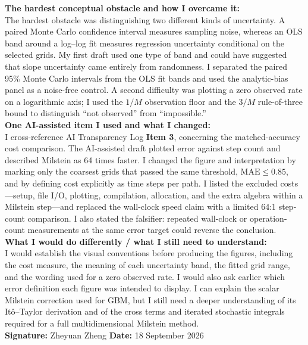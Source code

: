 \documentclass[11pt,a4paper]{article}
\theoremstyle{definition}
\theoremstyle{remark}
\begin{document}
\begin{formbox}
\begin{enumerate}[leftmargin=2em]
\end{enumerate}

\textbf{The hardest conceptual obstacle and how I overcame it:}\\
The hardest obstacle was distinguishing two different kinds of uncertainty.
A paired Monte Carlo confidence interval measures sampling noise, whereas an
OLS band around a log--log fit measures regression uncertainty conditional
on the selected grids. My first draft used one type of band and could have
suggested that slope uncertainty came entirely from randomness. I separated
the paired 95\% Monte Carlo intervals from the OLS fit bands and used the
analytic-bias panel as a noise-free control. A second difficulty was plotting
a zero observed rate on a logarithmic axis; I used the $1/M$ observation
floor and the $3/M$ rule-of-three bound to distinguish ``not observed'' from
``impossible.''\\[0.4em]

\textbf{One AI-assisted item I used and what I changed:}\\
I cross-reference AI Transparency Log \textbf{Item 3}, concerning the
matched-accuracy cost comparison. The AI-assisted draft plotted error
against step count and described Milstein as 64 times faster. I changed the
figure and interpretation by marking only the coarsest grids that passed the
same threshold, $\mathrm{MAE}\leq0.85$, and by defining cost explicitly as
time steps per path. I listed the excluded costs---setup, file I/O, plotting,
compilation, allocation, and the extra algebra within a Milstein step---and
replaced the wall-clock speed claim with a limited 64:1 step-count comparison.
I also stated the falsifier: repeated wall-clock or operation-count
measurements at the same error target could reverse the conclusion.\\[0.4em]

\textbf{What I would do differently / what I still need to understand:}\\
I would establish the visual conventions before producing the figures,
including the cost measure, the meaning of each uncertainty band, the fitted
grid range, and the wording used for a zero observed rate. I would also ask
earlier which error definition each figure was intended to display. I can
explain the scalar Milstein correction used for GBM, but I still need a
deeper understanding of its It\^o--Taylor derivation and of the cross terms
and iterated stochastic integrals required for a full multidimensional
Milstein method.\\[0.6em]

\textbf{Signature:} Zheyuan Zheng
\qquad
\textbf{Date:} 18 September 2026

\end{formbox}
\end{document}

